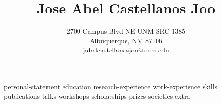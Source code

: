\documentclass[10pt]{article}
\author{2700 Campus Blvd NE UNM SRC 1385\\
Albuquerque, NM 87106\\
jabelcastellanosjoo@unm.edu}
\title{Jose Abel Castellanos Joo}
\date{}
\begin{document}
\maketitle

{personal-statement}
{education}
{research-experience}
{work-experience}
{skills}
{publications}
{talks}
{workshops}
{scholarships}
{prizes}
{societies}
{extra}
\end{document}
